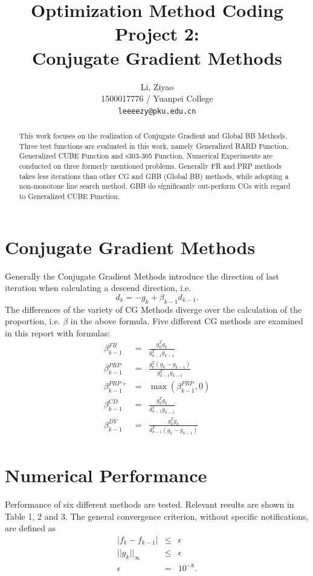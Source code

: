 \documentclass[11pt,a4paper]{article}
\title{Optimization Method Coding Project 2: \\ Conjugate Gradient Methods}
\author{Li, Ziyao \\
  1500017776 / Yuanpei College \\
  {\tt leeeezy@pku.edu.cn}
  }
\date{}
\begin{document}
\maketitle
\begin{abstract}
  This work focuses on the realization of Conjugate Gradient and Global BB Methods. Three test functions are evaluated in this work, namely Generalized BARD Function, Generalized CUBE Function and s303-305 Function. Numerical Experiments are conducted on three formerly mentioned problems. Generally FR and PRP methods takes less iterations than other CG and GBB (Global BB) methods, while adopting a non-monotone line search method, GBB do significantly out-perform CGs with regard to Generalized CUBE Function.
\end{abstract}

\section{Conjugate Gradient Methods}

Generally the Conjugate Gradient Methods introduce the direction of last iteration when calculating a descend direction, i.e.
\begin{displaymath}
  d_k = -g_k + \beta_{k-1} d_{k-1}.
\end{displaymath}
The differences of the variety of CG Methods diverge over the calculation of the proportion, i.e. $\beta$ in the above formula. Five different CG methods are examined in this report with formulas:
\begin{eqnarray*}
  \beta_{k-1}^{FR} &=& \frac{g_k^Tg_k}{g_{k-1}^Tg_{k-1}} \\
  \beta_{k-1}^{PRP} &=& \frac{g_k^T(g_k-g_{k-1})}{g_{k-1}^Tg_{k-1}} \\
  \beta_{k-1}^{PRP+} &=& \max\left(\beta_{k-1}^{PRP}, 0\right) \\
  \beta_{k-1}^{CD} &=& \frac{g_k^Tg_k}{d_{k-1}^Tg_{k-1}} \\
  \beta_{k-1}^{DY} &=& \frac{g_k^Tg_k}{d_{k-1}^T(g_k-g_{k-1})} \\
\end{eqnarray*}

\section{Numerical Performance}

Performance of six different methods are tested. Relevant results are shown in Table 1, 2 and 3. The general convergence criterion, without specific notifications, are defined as
\begin{eqnarray*}
  |f_{k} - f_{k-1}| & \le & \epsilon \\
  ||g_{k}||_{\infty} & \le & \epsilon \\
  \epsilon & = & 10^{-8}.
\end{eqnarray*}
\end{document}
